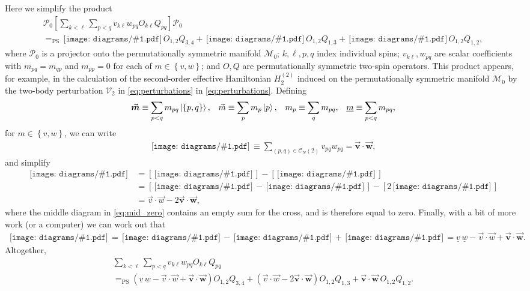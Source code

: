\documentclass[nofootinbib,notitlepage,11pt]{revtex4-2}
\newcommand{\p}[1]{\left(#1\right)} %
\renewcommand{\sp}[1]{\left[#1\right]} %
\renewcommand{\set}[1]{\left\{#1\right\}} %
\renewcommand{\c}{\cdot} %
\newcommand{\m}{\bm} %
\renewcommand{\v}{\vec} %
\newcommand{\1}{\mathds{1}}
\newcommand{\C}{\mathcal{C}}
\newcommand{\M}{\mathcal{M}}
\renewcommand{\P}{\mathcal{P}}
\newcommand{\V}{\mathcal{V}}
\newcommand{\EQPS}{=_{\text{PS}}}
\newcommand{\col}{\underline}
\newcommand{\diagram}[1]
{\,\texttt{[image: diagrams/\#1.pdf]}\,}
\begin{document}
Here we simplify the product
\begin{multline}
  \P_0 \sp{\sum_{k<\ell} \sum_{p<q}
    v_{k\ell} w_{pq} O_{k\ell} Q_{pq}} \P_0 \\
  \EQPS \diagram{two_body_0} O_{1,2} Q_{3,4}
  + \diagram{two_body_1} O_{1,2} Q_{1,3}
  + \diagram{two_body_2} O_{1,2} Q_{1,2},
  \label{eq:POQP_start}
\end{multline}
where $\P_0$ is a projector onto the permutationally symmetric
manifold $\M_0$; $k,\ell,p,q$ index individual spins;
$v_{k\ell},w_{pq}$ are scalar coefficients with $m_{pq}=m_{qp}$ and
$m_{pp}=0$ for each of $m\in\set{v,w}$; and $O,Q$ are permutationally
symmetric two-spin operators.  This product appears, for example, in
the calculation of the second-order effective Hamiltonian $H_2^{(2)}$
induced on the permutationally symmetric manifold $\M_0$ by the
two-body perturbation $\V_2$ in \eqref{eq:perturbations} in
\eqref{eq:perturbations}.  Defining
\begin{align}
  \v{\m m} \equiv \sum_{p<q} m_{pq} \ket{\set{p,q}},
  &&
  \v m \equiv \sum_p m_p \ket{p},
  &&
  m_p \equiv \sum_q m_{pq},
  &&
  \col{m} \equiv \sum_{p<q} m_{pq},
\end{align}
for $m\in\set{v,w}$, we can write
\begin{align}
  \diagram{two_body_2} \equiv \sum_{\p{p,q}\in\C_N\p{2}} v_{pq} w_{pq}
  = \v{\m v} \c\v{\m w},
\end{align}
and simplify
\begin{align}
  \diagram{two_body_1}
  &= \sp{\diagram{two_body_1_o}} - \sp{\diagram{two_body_1_x}} \\
  &= \sp{\diagram{two_body_1_oo} - \diagram{two_body_1_ox}}
  - \sp{2\diagram{two_body_2}} \label{eq:mid_zero} \\
  &= \v v \c \v w - 2 \v{\m v} \c \v{\m w},
\end{align}
where the middle diagram in \eqref{eq:mid_zero} contains an empty sum
for the cross, and is therefore equal to zero.  Finally, with a bit of
more work (or a computer) we can work out that
\begin{align}
  \diagram{two_body_0}
  = \diagram{two_body_0_oooo} - \diagram{two_body_1_ooo}
  + \diagram{two_body_2_oo}
  = \col{v}\,\col{w} -\v v\c\v w + \v{\m v}\c\v{\m w}.
\end{align}
Altogether,
\begin{multline}
  \sum_{k<\ell} \sum_{p<q} v_{k\ell} w_{pq} O_{k\ell} Q_{pq} \\
  \EQPS \p{\col{v}\,\col{w} -\v v\c\v w + \v{\m v}\c\v{\m w}}
  O_{1,2} Q_{3,4}
  + \p{\v v\c\v w - 2 \v{\m v} \c \v{\m w}} O_{1,2} Q_{1,3}
  + \v{\m v} \c \v{\m w}\, O_{1,2} Q_{1,2}.
  \label{eq:POQP}
\end{multline}
\end{document}
